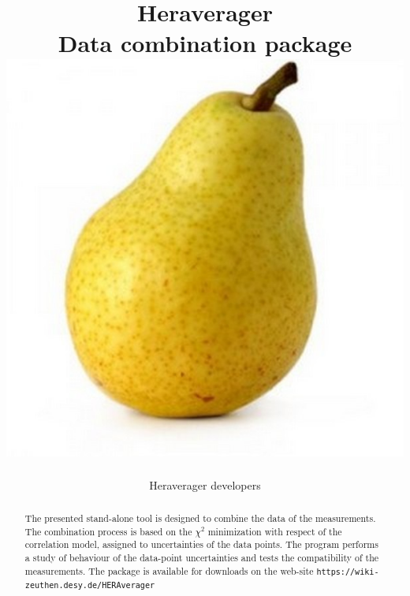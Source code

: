\documentclass[11pt,twoside,a4paper]{article}
\title{ \vspace{1cm} {\Huge Heraverager } \\
              Data combination package  \\ 
              \vspace{0.5cm}
\includegraphics[width=0.25\linewidth]{figures/logo.jpg}}
\author{Heraverager developers}
\begin{document}
\maketitle
\vspace{4cm}
\begin{abstract}
\vspace{0.5cm}
The presented stand-alone tool is designed to combine the data of the measurements. The combination process is based on the $\chi^2$ minimization with respect of the correlation model, assigned to uncertainties of the data points. The program performs a study of behaviour of the data-point uncertainties and tests the compatibility of the measurements. The package is available for downloads on the web-site {\tt https://wiki-zeuthen.desy.de/HERAverager}
\end{abstract}
\thispagestyle{empty}
\newpage
\tableofcontents
\linenumbers
\newpage


  






\end{document}
